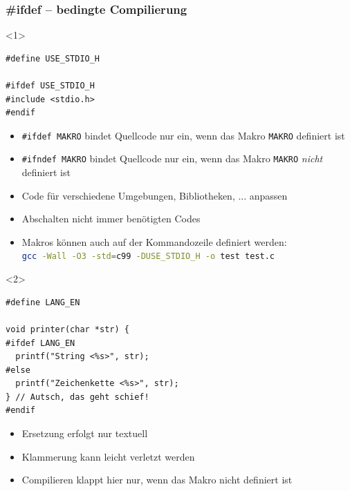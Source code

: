 \documentclass{slides}
\begin{document}
\begin{frame}[fragile]
  \frametitle{\#ifdef -- bedingte Compilierung}
  \begin{onlyenv}<1>
\begin{lstlisting}[emph=ifdef]
#define USE_STDIO_H

#ifdef USE_STDIO_H
#include <stdio.h>
#endif
\end{lstlisting}

    \begin{itemize}
    \item \lstinline!#ifdef MAKRO! bindet Quellcode nur ein, wenn das
      Makro \lstinline!MAKRO! definiert ist
    \item \lstinline!#ifndef MAKRO! bindet Quellcode nur ein, wenn das
      Makro \lstinline!MAKRO! \emph{nicht} definiert ist
    \item Code für verschiedene Umgebungen, Bibliotheken, ... anpassen
    \item Abschalten nicht immer benötigten Codes
    \item Makros können auch auf der Kommandozeile definiert werden:\\
      \lstinline[language=bash,keywords={},emph={DUSE_STDIO_H}]!gcc -Wall -O3 -std=c99 -DUSE_STDIO_H -o test test.c!
    \end{itemize}
  \end{onlyenv}

  \begin{onlyenv}<2>
\begin{lstlisting}
#define LANG_EN

void printer(char *str) {
#ifdef LANG_EN
  printf("String <%s>", str);
#else
  printf("Zeichenkette <%s>", str);
} // Autsch, das geht schief!
#endif
\end{lstlisting}
    \begin{itemize}
    \item Ersetzung erfolgt nur textuell
    \item Klammerung kann leicht verletzt werden
    \item Compilieren klappt hier nur, wenn das Makro nicht definiert ist
    \end{itemize}
  \end{onlyenv}
\end{frame}
\end{document}
